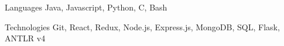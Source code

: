 

\begin{cvskills}

  \cvskill
    {Languages} %
    {Java, Javascript, Python, C, Bash} %

  \cvskill
    {Technologies} %
    {Git, React, Redux, Node.js, Express.js, MongoDB, SQL, Flask, ANTLR v4} %

\end{cvskills}
